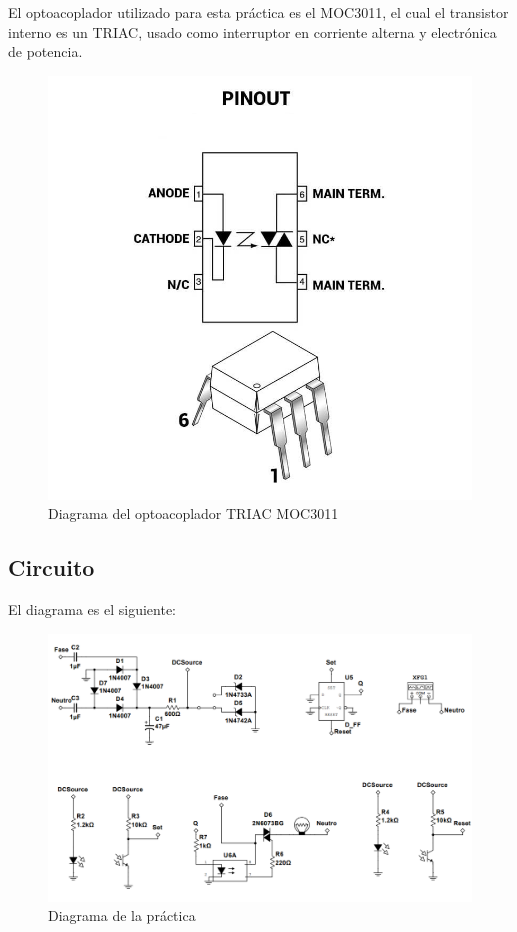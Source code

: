 El optoacoplador utilizado para esta práctica es el MOC3011, el cual el transistor interno es un TRIAC, usado como interruptor
en corriente alterna y electrónica de potencia.

\begin{figure}
    \centering
    \includegraphics[scale=0.15]{media/MOC3011.jpg}
    \caption{Diagrama del optoacoplador TRIAC MOC3011}
    \label{Fig: Diagrama del optoacoplador TRIAC MOC3011}
\end{figure}


\subsection{Circuito}

El diagrama es el siguiente:

\begin{figure}[h]
    \centering
    \includegraphics[scale=0.4]{media/Circuito.png}
    \caption{Diagrama de la práctica}
    \label{Fig: Diagrama de la práctica}
\end{figure}

